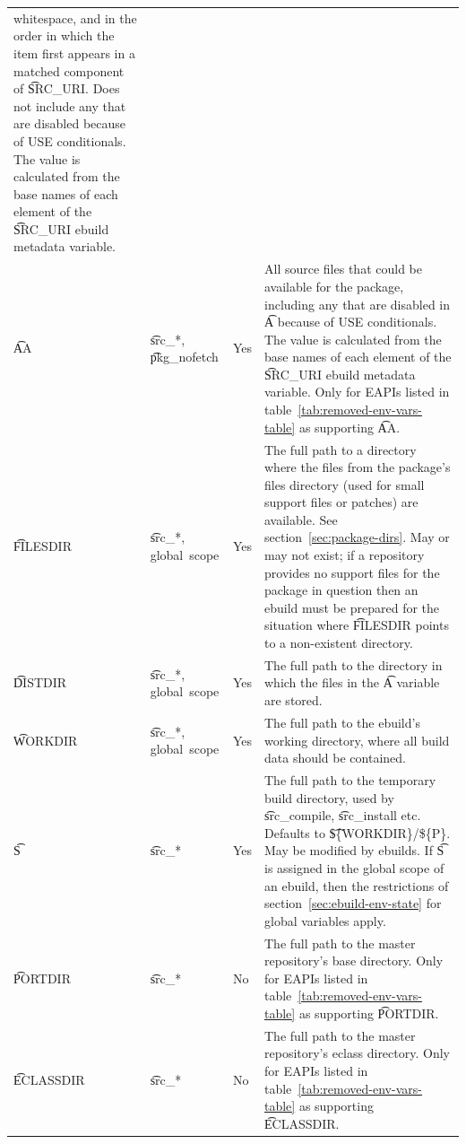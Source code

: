 \begin{landscape}
\begin{longtable}{l P{7em} l p{\mycolwidth}}
    whitespace, and in the order in which the item first appears in a matched component of
    \t{SRC_URI}\@. Does not include any that are disabled because of USE conditionals. The value is
    calculated from the base names of each element of the \t{SRC_URI} ebuild metadata variable. \\
\t{AA} &
    \t{src_*}, \t{pkg_nofetch} &
    Yes &
     All source files that could be available for the package, including any that
    are disabled in \t{A} because of USE conditionals. The value is calculated from the base names
    of each element of the \t{SRC_URI} ebuild metadata variable. Only for EAPIs listed in
    table~\ref{tab:removed-env-vars-table} as supporting \t{AA}. \\
\t{FILESDIR} &
    \t{src_*}, global~scope &
    Yes &
    The full path to a directory where the files from the package's files directory (used for
    small support files or patches) are available. See section~\ref{sec:package-dirs}. May or may
    not exist; if a repository provides no support files for the package in question then an ebuild
    must be prepared for the situation where \t{FILESDIR} points to a non-existent directory. \\
\t{DISTDIR} &
    \t{src_*}, global~scope &
    Yes &
    The full path to the directory in which the files in the \t{A} variable are stored. \\
\t{WORKDIR} &
    \t{src_*}, global~scope &
    Yes &
    The full path to the ebuild's working directory, where all build data should be contained. \\
\t{S} &
    \t{src_*} &
    Yes &
    The full path to the temporary build directory, used by \t{src_compile}, \t{src_install} etc.
    Defaults to \t{\$\{WORKDIR\}/\$\{P\}}. May be modified by ebuilds. If \t{S} is assigned in the
    global scope of an ebuild, then the restrictions of section~\ref{sec:ebuild-env-state} for
    global variables apply. \\
\t{PORTDIR} &
    \t{src_*} &
    No &
     The full path to the master repository's base directory. Only for EAPIs
    listed in table~\ref{tab:removed-env-vars-table} as supporting \t{PORTDIR}. \\
\t{ECLASSDIR} &
    \t{src_*} &
    No &
     The full path to the master repository's eclass directory. Only for
    EAPIs listed in table~\ref{tab:removed-env-vars-table} as supporting \t{ECLASSDIR}. \\

\end{longtable}
\end{landscape}
